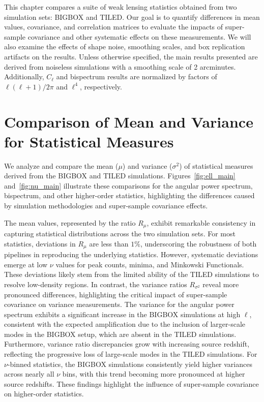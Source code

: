 This chapter compares a suite of weak lensing statistics obtained from two simulation sets: BIGBOX and TILED. Our goal is to quantify differences in mean values, covariance, and correlation matrices to evaluate the impacts of super-sample covariance and other systematic effects on these measurements. We will also examine the effects of shape noise, smoothing scales, and box replication artifacts on the results. Unless otherwise specified, the main results presented are derived from noiseless simulations with a smoothing scale of 2 arcminutes. Additionally, $C_\ell$ and bispectrum results are normalized by factors of $\ell(\ell+1)/2\pi$ and $\ell^4$, respectively.

\section{Comparison of Mean and Variance for Statistical Measures}
We analyze and compare the mean ($\mu$) and variance ($\sigma^2$) of statistical measures derived from the BIGBOX and TILED simulations. Figures~\ref{fig:ell_main} and~\ref{fig:nu_main} illustrate these comparisons for the angular power spectrum, bispectrum, and other higher-order statistics, highlighting the differences caused by simulation methodologies and super-sample covariance effects.

The mean values, represented by the ratio $R_{\mu}$, exhibit remarkable consistency in capturing statistical distributions across the two simulation sets. For most statistics, deviations in $R_{\mu}$ are less than $1\%$, underscoring the robustness of both pipelines in reproducing the underlying statistics. However, systematic deviations emerge at low $\nu$ values for peak counts, minima, and Minkowski Functionals. These deviations likely stem from the limited ability of the TILED simulations to resolve low-density regions.
In contrast, the variance ratios $R_{\sigma^2}$ reveal more pronounced differences, highlighting the critical impact of super-sample covariance on variance measurements. The variance for the angular power spectrum exhibits a significant increase in the BIGBOX simulations at high $\ell$, consistent with the expected amplification due to the inclusion of larger-scale modes in the BIGBOX setup, which are absent in the TILED simulations. Furthermore, variance ratio discrepancies grow with increasing source redshift, reflecting the progressive loss of large-scale modes in the TILED simulations. For $\nu$-binned statistics, the BIGBOX simulations consistently yield higher variances across nearly all $\nu$ bins, with this trend becoming more pronounced at higher source redshifts. These findings highlight the influence of super-sample covariance on higher-order statistics. 

